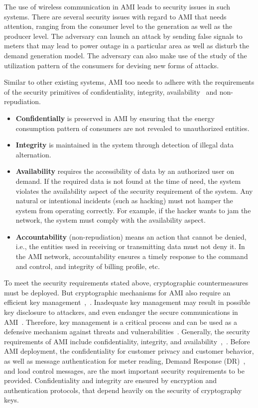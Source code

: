 The use of wireless communication in AMI leads to security issues in such systems. There are several security issues with regard to AMI that needs attention, ranging from the consumer level to the generation as well as the producer level. The adversary can launch an attack by sending false signals to meters that may lead to power outage in a particular area as well as disturb the demand generation model. The adversary can also make use of the study of the utilization pattern of the consumers for devising new forms of attacks.
\par Similar to other existing systems, AMI too needs to adhere with the requirements of the security primitives of confidentiality, integrity, availability~\cite{Gungor11} and non-repudiation.
\begin{itemize}
\item \textbf{Confidentially} is preserved in AMI by ensuring that the energy consumption pattern of consumers are not revealed to unauthorized entities.  
\item \textbf{Integrity} is maintained in the system through detection of illegal data alternation. 
\item \textbf{Availability} requires the accessibility of data by an authorized user on demand. If the required data is not found at the time of need, the system violates the availability aspect of the security requirement of the system. Any natural or intentional incidents (such as hacking) must not hamper the system from operating correctly. For example, if the hacker wants to jam the network, the system must comply with the availability aspect. 
\item \textbf{Accountability} (non-repudiation) means an action that cannot be denied, i.e., the entities used in receiving or transmitting data must not deny it. In the AMI network, accountability ensures a timely response to the command and control, and integrity of billing profile, etc. 
\end {itemize}
\par To meet the security requirements stated above, cryptographic countermeasures must be deployed. But cryptographic mechanisms for AMI also require an efficient key management~\cite{Hasan2015},~\cite{Seo2013}. Inadequate key management may result in possible key disclosure to attackers, and even endanger the secure communications in AMI~\cite{Benmalek2016}. Therefore, key management is a critical process and can be used as a defensive mechanism against threats and vulnerabilities~\cite{Das12}. Generally, the security requirements of AMI include confidentiality, integrity, and availability~\cite{Kamto11},~\cite{Rabieh17}. Before AMI deployment, the confidentiality for customer privacy and customer behavior, as well as message authentication for meter reading, Demand Response (DR)~\cite{Deng15}, and load control messages, are the most important security requirements to be provided. Confidentiality and integrity are ensured by encryption and authentication protocols, that depend heavily on the security of cryptography keys. 
